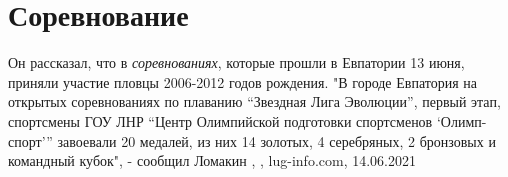 
 
 
 
 
\chapter{Соревнование}
\label{sec:slova.sorevnovanie}

Он рассказал, что в \emph{соревнованиях}, которые прошли в Евпатории 13 июня,
приняли участие пловцы 2006-2012 годов рождения.  "В городе Евпатория на
открытых соревнованиях по плаванию \enquote{Звездная Лига Эволюции}, первый
этап, спортсмены ГОУ ЛНР \enquote{Центр Олимпийской подготовки
спортсменов \enquote{Олимп-спорт}} завоевали 20 медалей, из них 14 золотых, 4
серебряных, 2 бронзовых и командный кубок", - сообщил Ломакин
, 
, lug-info.com, 14.06.2021

